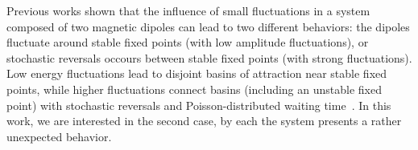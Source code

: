 Previous works shown that the influence of small fluctuations in a system composed of two magnetic dipoles can lead to two different behaviors: the dipoles fluctuate around stable fixed points (with low amplitude fluctuations), or stochastic reversals occours between stable fixed points (with strong fluctuations). Low energy fluctuations lead to disjoint basins of attraction near stable fixed points, while higher fluctuations connect basins (including an unstable fixed point) with stochastic reversals and Poisson-distributed waiting time~\cite{StochasticReversalDynamics}. In this work, we are interested in the second case, by each the system presents a rather unexpected behavior.  




